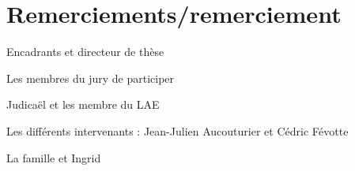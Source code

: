 \chapter*{Remerciements/remerciement}

Encadrants et directeur de thèse

Les membres du jury de participer

Judicaël et les membre du LAE

Les différents intervenants : Jean-Julien Aucouturier et Cédric Févotte

La famille et Ingrid

